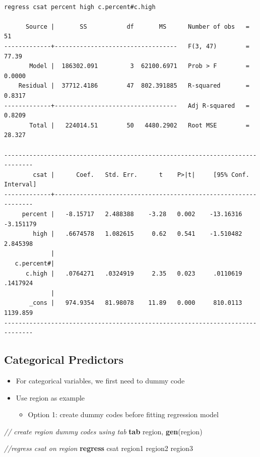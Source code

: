 \documentclass[
]{book}
\newenvironment{Shaded}{\begin{snugshade}}{\end{snugshade}}
\newcommand{\CommentTok}[1]{\textcolor[rgb]{0.56,0.35,0.01}{\textit{#1}}}
\newcommand{\KeywordTok}[1]{\textcolor[rgb]{0.13,0.29,0.53}{\textbf{#1}}}
\newcommand{\NormalTok}[1]{#1}
\providecommand{\tightlist}{%
  \setlength{\itemsep}{0pt}\setlength{\parskip}{0pt}}
\begin{document}
\begin{verbatim}

regress csat percent high c.percent#c.high

      Source |       SS           df       MS      Number of obs   =        51
-------------+----------------------------------   F(3, 47)        =     77.39
       Model |  186302.091         3  62100.6971   Prob > F        =    0.0000
    Residual |  37712.4186        47  802.391885   R-squared       =    0.8317
-------------+----------------------------------   Adj R-squared   =    0.8209
       Total |   224014.51        50   4480.2902   Root MSE        =    28.327

------------------------------------------------------------------------------
        csat |      Coef.   Std. Err.      t    P>|t|     [95% Conf. Interval]
-------------+----------------------------------------------------------------
     percent |   -8.15717   2.488388    -3.28   0.002    -13.16316   -3.151179
        high |   .6674578   1.082615     0.62   0.541    -1.510482    2.845398
             |
   c.percent#|
      c.high |   .0764271   .0324919     2.35   0.023     .0110619    .1417924
             |
       _cons |   974.9354   81.98078    11.89   0.000     810.0113    1139.859
------------------------------------------------------------------------------
\end{verbatim}

\hypertarget{categorical-predictors}{%
\subsection{Categorical Predictors}\label{categorical-predictors}}

\begin{itemize}
\tightlist
\item
  For categorical variables, we first need to dummy code
\item
  Use region as example

  \begin{itemize}
  \tightlist
  \item
    Option 1: create dummy codes before fitting regression model
  \end{itemize}
\end{itemize}

\begin{Shaded}
\begin{Highlighting}[]
  \CommentTok{// create region dummy codes using tab }
  \KeywordTok{tab}\NormalTok{ region, }\KeywordTok{gen}\NormalTok{(region)}

  \CommentTok{//regress csat on region}
  \KeywordTok{regress}\NormalTok{ csat region1 region2 region3}
\end{Highlighting}
\end{Shaded}
\end{document}

